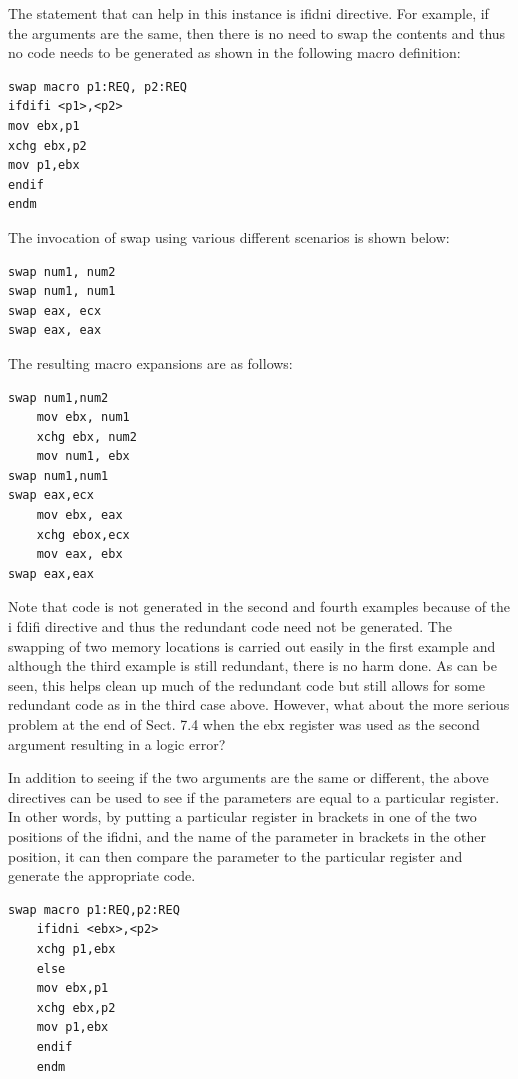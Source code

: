 \documentclass[10pt]{book}
\begin{document}
The statement that can help in this instance is ifidni directive. For example, if the arguments are the same, then there is no need to swap the contents and thus no code needs to be generated as shown in the following macro definition:

\begin{verbatim}
swap macro p1:REQ, p2:REQ
ifdifi <p1>,<p2>
mov ebx,p1
xchg ebx,p2
mov p1,ebx
endif
endm
\end{verbatim}

The invocation of swap using various different scenarios is shown below:

\begin{verbatim}
swap num1, num2
swap num1, num1
swap eax, ecx
swap eax, eax
\end{verbatim}

The resulting macro expansions are as follows:

\begin{verbatim}
swap num1,num2
    mov ebx, num1
    xchg ebx, num2
    mov num1, ebx
swap num1,num1
swap eax,ecx
    mov ebx, eax
    xchg ebox,ecx
    mov eax, ebx
swap eax,eax
\end{verbatim}

Note that code is not generated in the second and fourth examples because of the i fdifi directive and thus the redundant code need not be generated. The swapping of two memory locations is carried out easily in the first example and although the third example is still redundant, there is no harm done. As can be seen, this helps clean up much of the redundant code but still allows for some redundant code as in the third case above. However, what about the more serious problem at the end of Sect. 7.4 when the ebx register was used as the second argument resulting in a logic error?

In addition to seeing if the two arguments are the same or different, the above directives can be used to see if the parameters are equal to a particular register. In other words, by putting a particular register in brackets in one of the two positions of the ifidni, and the name of the parameter in brackets in the other position, it can then compare the parameter to the particular register and generate the appropriate code.

\begin{verbatim}
swap macro p1:REQ,p2:REQ
    ifidni <ebx>,<p2>
    xchg p1,ebx
    else
    mov ebx,p1
    xchg ebx,p2
    mov p1,ebx
    endif
    endm
\end{verbatim}
\end{document}
